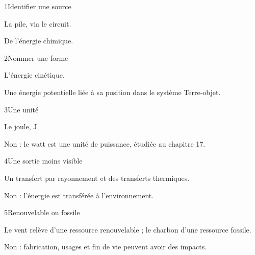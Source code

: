 \par\noindent\begin{minipage}{\linewidth}
\begin{corrige}{1}{Identifier une source}
\begin{questions}
\item La pile, via le circuit.
\item De l’énergie chimique.
\end{questions}
\end{corrige}
\end{minipage}
\par\noindent\begin{minipage}{\linewidth}
\begin{corrige}{2}{Nommer une forme}
\begin{questions}
\item L’énergie cinétique.
\item Une énergie potentielle liée à sa position dans le système Terre-objet.
\end{questions}
\end{corrige}
\end{minipage}
\par\noindent\begin{minipage}{\linewidth}
\begin{corrige}{3}{Une unité}
\begin{questions}
\item Le joule, J.
\item Non : le watt est une unité de puissance, étudiée au chapitre 17.
\end{questions}
\end{corrige}
\end{minipage}
\par\noindent\begin{minipage}{\linewidth}
\begin{corrige}{4}{Une sortie moins visible}
\begin{questions}
\item Un transfert par rayonnement et des transferts thermiques.
\item Non : l’énergie est transférée à l’environnement.
\end{questions}
\end{corrige}
\end{minipage}
\par\noindent\begin{minipage}{\linewidth}
\begin{corrige}{5}{Renouvelable ou fossile}
\begin{questions}
\item Le vent relève d’une ressource renouvelable ; le charbon d’une ressource fossile.
\item Non : fabrication, usages et fin de vie peuvent avoir des impacts.
\end{questions}
\end{corrige}
\end{minipage}
